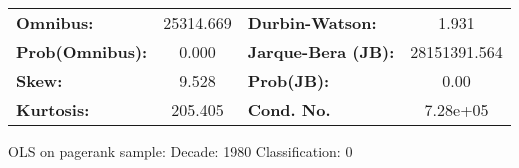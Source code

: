 \begin{center}
\begin{tabular}{lccccc}
\bottomrule
\end{tabular}
\begin{tabular}{lclc}
\textbf{Omnibus:}       & 25314.669 & \textbf{  Durbin-Watson:     } &      1.931    \\
\textbf{Prob(Omnibus):} &    0.000  & \textbf{  Jarque-Bera (JB):  } & 28151391.564  \\
\textbf{Skew:}          &    9.528  & \textbf{  Prob(JB):          } &       0.00    \\
\textbf{Kurtosis:}      &  205.405  & \textbf{  Cond. No.          } &   7.28e+05    \\
\bottomrule
\end{tabular}
\end{center}
\break
OLS on pagerank sample: Decade: 1980 Classification: 0
